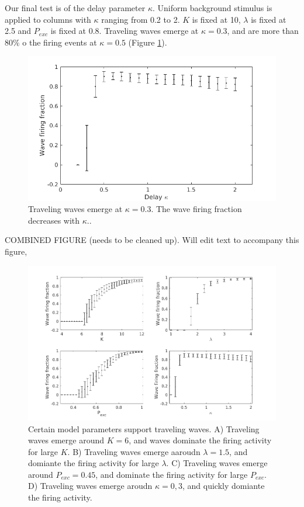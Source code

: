 \documentclass[a4paper,11pt]{article}
\begin{document}
Our final test is of the delay parameter $\kappa$.
Uniform background stimulus is applied to columns with $\kappa$ ranging from 0.2 to 2.
$K$ is fixed at 10, $\lambda$ is fixed at 2.5 and $P_{exc}$ is fixed at 0.8.
Traveling waves emerge at $\kappa=0.3$, and are more than $80\%$ o the firing events at $\kappa=0.5$ (Figure \ref{fig:kappa_fraction}).
\begin{figure}[!htb]
 \caption{Traveling waves emerge at $\kappa=0.3$. The wave firing fraction decreases with $\kappa$..}
 \label{fig:kappa_fraction}
 \centering
   \includegraphics[width=\textwidth]{fig/KappaWaveFraction}
\end{figure}

\FloatBarrier

COMBINED FIGURE (needs to be cleaned up). 
Will edit text to accompany this figure, 
\begin{figure}[!htb]
 \centering
 \includegraphics[width=\textwidth]{fig/ParamWaveSim}
 \caption{Certain model parameters support traveling waves. A) Traveling waves emerge around $K=6$, and waves dominate the firing activity for large $K$. B) Traveling waves emerge aaroudn $\lambda=1.5$, and domiante the firing activity for large $\lambda$. C) Traveling waves emerge around $P_{exc}=0.45$, and dominate the firing activity for large $P_{exc}$. D) Traveling waves emerge aroudn $\kappa=0,3$, and quickly domiante the firing activity. }
 \label{fig:wave_parameters}
\end{figure}
\end{document}
